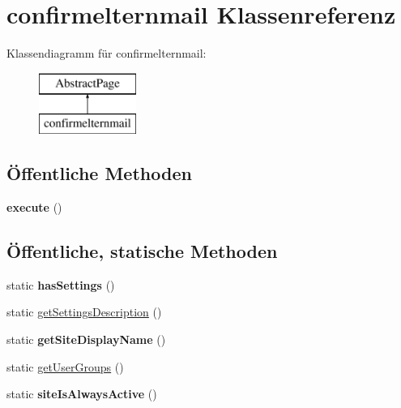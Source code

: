 \hypertarget{classconfirmelternmail}{}\section{confirmelternmail Klassenreferenz}
\label{classconfirmelternmail}
Klassendiagramm für confirmelternmail\+:\begin{figure}[H]
\begin{center}
\leavevmode
\includegraphics[height=2.000000cm]{classconfirmelternmail}
\end{center}
\end{figure}
\subsection*{Öffentliche Methoden}
\begin{DoxyCompactItemize}
\item 
\mbox{\label{classconfirmelternmail_afb29b273675cea192ad1023f2f0a2fcd}} 
{\bfseries execute} ()
\end{DoxyCompactItemize}
\subsection*{Öffentliche, statische Methoden}
\begin{DoxyCompactItemize}
\item 
\mbox{\label{classconfirmelternmail_a0195f8cb3038de73dc528c3db5407a50}} 
static {\bfseries has\+Settings} ()
\item 
static \mbox{\hyperlink{classconfirmelternmail_a808cb37c809df7163829d5b0bfd9db4c}{get\+Settings\+Description}} ()
\item 
\mbox{\label{classconfirmelternmail_a22897543f551155b02591c25261541c1}} 
static {\bfseries get\+Site\+Display\+Name} ()
\item 
static \mbox{\hyperlink{classconfirmelternmail_a33f2ef17af78b5cce1fea00bfac328ba}{get\+User\+Groups}} ()
\item 
\mbox{\label{classconfirmelternmail_aa315475de8730ab92801f403e7919749}} 
static {\bfseries site\+Is\+Always\+Active} ()
\end{DoxyCompactItemize}
